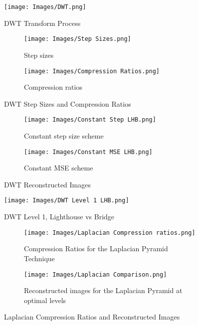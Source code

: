 \begin{figure}[h]
\centering
  \texttt{[image: Images/DWT.png]}
  \caption{DWT Transform Process}
  \label{fig:DWT Transform Process}
\end{figure}
\vspace{-2mm}


\begin{figure}[h!]
\begin{subfigure}{.5\textwidth}
\centering
  \texttt{[image: Images/Step Sizes.png]}
  \caption{Step sizes}
  \label{fig:DWT step sizes}
\end{subfigure}%
\begin{subfigure}{.5\textwidth}
\centering
  \texttt{[image: Images/Compression Ratios.png]}
  \caption{Compression ratios}
  \label{fig:DWT compression ratios}
\end{subfigure}
\caption{DWT Step Sizes and Compression Ratios}
\label{fig:DWT step sizes and compression ratios}
\end{figure}

\begin{figure}[h]
\centering
\begin{subfigure}{.6\textwidth}
  \centering
    \texttt{[image: Images/Constant Step LHB.png]}
    \caption{Constant step size scheme}
    \label{fig: DWT Constant Step LHB}
\end{subfigure}%
\begin{subfigure}{.4\textwidth}
  \centering
    \texttt{[image: Images/Constant MSE LHB.png]}
    \caption{Constant MSE scheme}
    \label{fig:DWT Constant MSE LHB}
\end{subfigure}
\caption{DWT Reconstructed Images}
\label{fig:DWT Reconstructed images}
\end{figure}

\begin{figure}[h]
\centering
  \texttt{[image: Images/DWT Level 1 LHB.png]}
  \caption{DWT Level 1, Lighthouse vs Bridge}
  \label{fig:DWT Level 1 LHB}
\end{figure}

\begin{figure}[h]
\centering
\begin{subfigure}{.4\textwidth}
  \centering
    \texttt{[image: Images/Laplacian Compression ratios.png]}
    \caption{Compression Ratios for the Laplacian Pyramid Technique}
    \label{fig:Laplacian Compression Ratio}
\end{subfigure}%
\begin{subfigure}{.6\textwidth}
  \centering
    \texttt{[image: Images/Laplacian Comparison.png]}
    \caption{Reconstructed images for the Laplacian Pyramid at optimal levels}
    \label{fig:Laplacian Reconstructed Images}
\end{subfigure}
\caption{Laplacian Compression Ratios and Reconstructed Images}
\label{fig:Laplacian Comparison}
\end{figure}
